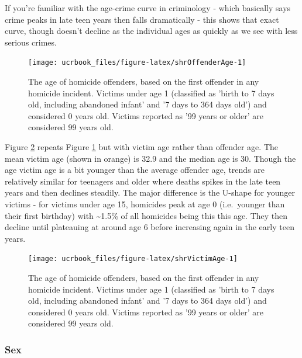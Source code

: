 \documentclass[
  12pt,
  openany]{book}
\begin{document}
If you're familiar with the age-crime curve in criminology - which basically says crime peaks in late teen years then falls dramatically - this shows that exact curve, though doesn't decline as the individual ages as quickly as we see with less serious crimes.

\begin{figure}

{\centering \texttt{[image: ucrbook\_files/figure-latex/shrOffenderAge-1]} 

}

\caption{The age of homicide offenders, based on the first offender in any homicide incident. Victims under age 1 (classified as 'birth to 7 days old, including abandoned infant' and '7 days to 364 days old') and considered 0 years old. Victims reported as '99 years or older' are considered 99 years old.}\label{fig:shrOffenderAge}
\end{figure}

Figure \ref{fig:shrVictimAge} repeats Figure \ref{fig:shrOffenderAge} but with victim age rather than offender age. The mean victim age (shown in orange) is 32.9 and the median age is 30. Though the age victim age is a bit younger than the average offender age, trends are relatively similar for teenagers and older where deaths spikes in the late teen years and then declines steadily. The major difference is the U-shape for younger victims - for victims under age 15, homicides peak at age 0 (i.e.~younger than their first birthday) with \textasciitilde1.5\% of all homicides being this this age. They then decline until plateauing at around age 6 before increasing again in the early teen years.

\begin{figure}

{\centering \texttt{[image: ucrbook\_files/figure-latex/shrVictimAge-1]} 

}

\caption{The age of homicide offenders, based on the first offender in any homicide incident. Victims under age 1 (classified as 'birth to 7 days old, including abandoned infant' and '7 days to 364 days old') and considered 0 years old. Victims reported as '99 years or older' are considered 99 years old.}\label{fig:shrVictimAge}
\end{figure}

\hypertarget{sex}{%
\subsubsection{Sex}\label{sex}}
\end{document}
